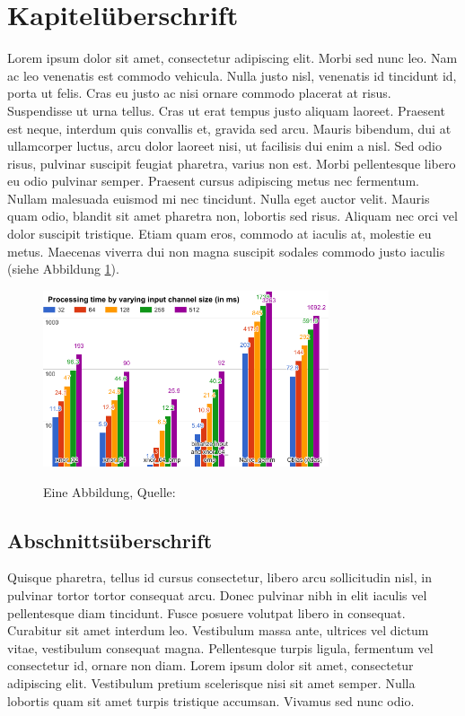 \section{Kapitelüberschrift}
Lorem ipsum dolor sit amet, consectetur adipiscing elit. Morbi sed nunc leo. Nam ac leo venenatis est commodo vehicula. Nulla justo nisl, venenatis id tincidunt id, porta ut felis. Cras eu justo ac nisi ornare commodo placerat at risus. Suspendisse ut urna tellus. Cras ut erat tempus justo aliquam laoreet. Praesent est neque, interdum quis convallis et, gravida sed arcu. Mauris bibendum, dui at ullamcorper luctus, arcu dolor laoreet nisi, ut facilisis dui enim a nisl. Sed odio risus, pulvinar suscipit feugiat pharetra, varius non est. Morbi pellentesque libero eu odio pulvinar semper. Praesent cursus adipiscing metus nec fermentum. Nullam malesuada euismod mi nec tincidunt. Nulla eget auctor velit. Mauris quam odio, blandit sit amet pharetra non, lobortis sed risus. Aliquam nec orci vel dolor suscipit tristique. Etiam quam eros, commodo at iaculis at, molestie eu metus. Maecenas viverra dui non magna suscipit sodales commodo justo iaculis (siehe Abbildung \ref{abb:test}).

\begin{figure}[hbp]
\begin{center}
\includegraphics*[width=0.75\textwidth]{beispiel.png}\\
\caption{Eine Abbildung, Quelle: \cite{caicedo2015active}}
\label{abb:test}
\end{center}
\end{figure}

\subsection{Abschnittsüberschrift}
Quisque pharetra, tellus id cursus consectetur, libero arcu sollicitudin nisl, in pulvinar tortor tortor consequat arcu. Donec pulvinar nibh in elit iaculis vel pellentesque diam tincidunt. Fusce posuere volutpat libero in consequat. Curabitur sit amet interdum leo. Vestibulum massa ante, ultrices vel dictum vitae, vestibulum consequat magna. Pellentesque turpis ligula, fermentum vel consectetur id, ornare non diam. Lorem ipsum dolor sit amet, consectetur adipiscing elit. Vestibulum pretium scelerisque nisi sit amet semper. Nulla lobortis quam sit amet turpis tristique accumsan. Vivamus sed nunc odio.

